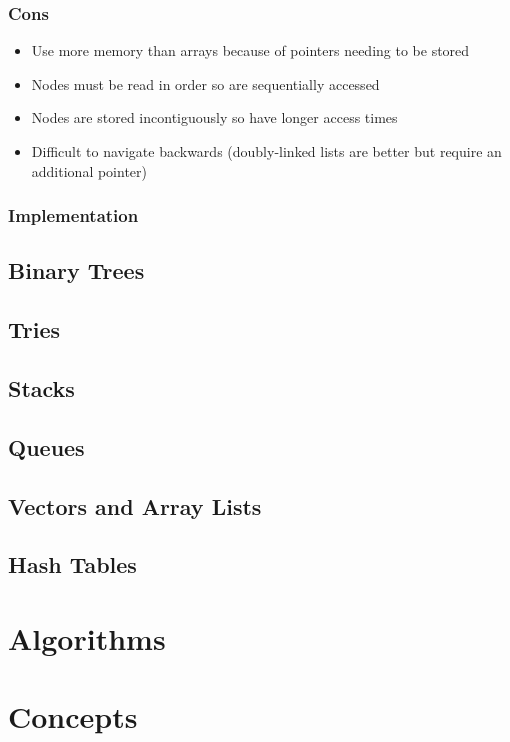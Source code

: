\documentclass{article}
\begin{document}
\subsubsection{Cons}
\begin{itemize}
	\item Use more memory than arrays because of pointers needing to be stored
	
	\item Nodes must be read in order so are sequentially accessed
	
	\item Nodes are stored incontiguously so have longer access times
	
	\item Difficult to navigate backwards (doubly-linked lists are better but require an additional pointer)
	
\end{itemize}

\subsubsection{Implementation}


\subsection{Binary Trees}

\subsection{Tries}

\subsection{Stacks}

\subsection{Queues}

\subsection{Vectors and Array Lists	}

\subsection{Hash Tables}

\section{Algorithms}


\section{Concepts}
\end{document}
